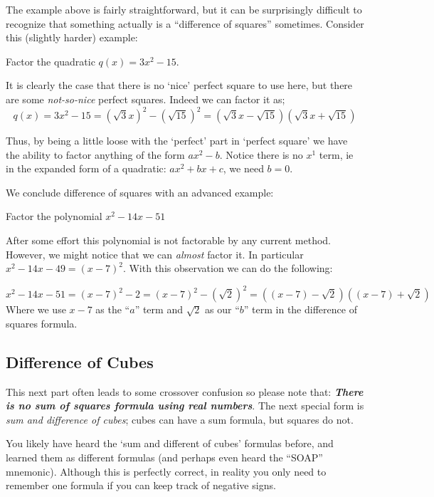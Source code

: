 \documentclass{ximera}
\begin{document}
    The example above is fairly straightforward, but it can be surprisingly difficult to recognize that something actually is a ``difference of squares'' sometimes. Consider this (slightly harder) example:
    
    \begin{example}
        Factor the quadratic $q(x) = 3x^2 - 15$.
        
        It is clearly the case that there is no `nice' perfect square to use here, but there are some \textit{not-so-nice} perfect squares. Indeed we can factor it as;
        \[
            q(x) = 3x^2 - 15
            = (\sqrt{3}x)^2 - (\sqrt{15})^2
            = (\sqrt{3}x - \sqrt{15})(\sqrt{3}x + \sqrt{15})
        \]
    \end{example}
    
    Thus, by being a little loose with the `perfect' part in `perfect square' we have the ability to factor anything of the form $ax^2 - b$. Notice there is no $x^1$ term, ie in the expanded form of a quadratic: $ax^2 + bx + c$, we need $b = 0$.
    
    We conclude difference of squares with an advanced example:
    
    \begin{example}
        Factor the polynomial $x^2 - 14x - 51$
        
        After some effort this polynomial is not factorable by any current method. However, we might notice that we can \textit{almost} factor it. In particular $x^2 - 14x - 49 = (x-7)^2$. With this observation we can do the following:
        
        \[
            x^2 - 14x - 51 = (x-7)^2 - 2 = (x-7)^2 - (\sqrt{2})^2 = ((x-7) - \sqrt{2})((x-7) + \sqrt{2})
        \]
        Where we use $x-7$ as the ``$a$'' term and $\sqrt{2}$ as our ``$b$'' term in the difference of squares formula.
    \end{example}

\subsection*{Difference of Cubes}
    This next part often leads to some crossover confusion so please note that: \textit{\textbf{There is no sum of squares formula using real numbers}}. The next special form is \textit{sum and difference of cubes}; cubes can have a sum formula, but squares do not.
    
    You likely have heard the `sum and different of cubes' formulas before, and learned them as different formulas (and perhaps even heard the ``SOAP'' mnemonic). Although this is perfectly correct, in reality you only need to remember one formula if you can keep track of negative signs. 
    
\end{document}
